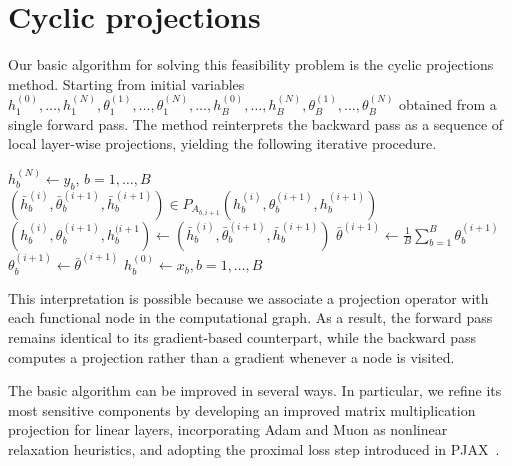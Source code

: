 \documentclass{article}
\theoremstyle{plain}
\theoremstyle{definition}
\theoremstyle{remark}
\begin{document}
\section{Cyclic projections}
Our basic algorithm for solving this feasibility problem is the cyclic projections method. Starting from initial variables $h^{(0)}_1, \ldots, h^{(N)}_1, \theta^{(1)}_1, \ldots, \theta^{(N)}_1, \ldots, h^{(0)}_B, \ldots, h^{(N)}_B, \theta^{(1)}_B, \ldots, \theta^{(N)}_B$  obtained from a single forward pass. The method reinterprets the backward pass as a sequence of local layer-wise  projections, yielding the following iterative procedure.
\begin{algorithm}
\caption{Cyclic projections method.}\label{alg:cyclic}
\begin{algorithmic}[1]
\State $h^{(N)}_b \gets y_b$, $b=1,\ldots, B$  
        \State $(\bar h^{(i)}_b, \bar \theta^{(i+1)}_b, \bar h^{(i+1)}_b) \in P_{A_{b,i+1}}(h^{(i)}_b, \theta^{(i+1)}_b, h^{(i+1)}_b)$  
        \State $(h^{(i)}_b, \theta^{(i+1)}_b, h^{(i+1}_b) \gets (\bar h^{(i)}_b, \bar \theta^{(i+1)}_b, \bar h^{(i+1)}_b)$
    \EndFor
    \State $\bar \theta^{(i+1)} \gets \frac{1}{B}\sum_{b=1}^B \theta_{b}^{(i+1)}$
    \State $\theta^{(i+1)}_b \gets \bar \theta^{(i+1)}$  
\EndFor
\State $h^{(0)}_b \gets x_b, b=1,\ldots,B$ 
\end{algorithmic}
\end{algorithm}

This interpretation is possible because we associate a projection operator with each functional node in the computational graph. As a result, the forward pass remains identical to its gradient-based counterpart, while the backward pass computes a projection rather than a gradient whenever a node is visited.

The basic algorithm can be improved in several ways. In particular, we refine its most sensitive components by developing an improved matrix multiplication projection for linear layers, incorporating Adam and Muon as nonlinear relaxation heuristics, and adopting the proximal loss step introduced in PJAX~\cite{bergmeister2025projection}.
\end{document}
